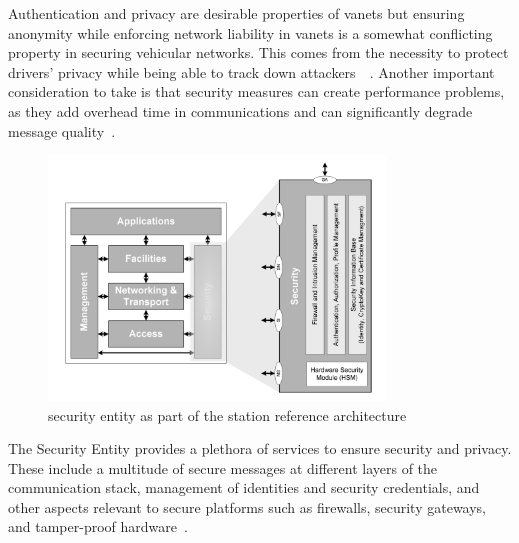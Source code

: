 Authentication and privacy are desirable properties of \glspl{vanet} but ensuring anonymity while enforcing network liability in \glspl{vanet} is a somewhat conflicting property in securing vehicular networks. This comes from the necessity to protect drivers' privacy while being able to track down attackers~\cite{jiang_ieee_2008}~\cite{malhi_security_2020}. 
Another important consideration to take is that security measures can create performance problems, as they add overhead time in communications and can significantly degrade message quality~\cite{toor_vehicle_2008}. 


\begin{figure}[htbp]
    \centering
    \includegraphics[width=0.8\textwidth]{Chapters/Figures/VANETs/security_entity.png}
   	\caption{ security entity as part of the  station reference architecture~\cite{etsi_intelligent_2010}}
   	\label{fig:security_entity}
\end{figure}


The Security Entity provides a plethora of services to ensure security and privacy. These include a multitude of secure messages at different layers of the communication stack, management of identities and security credentials, and other aspects relevant to secure platforms such as firewalls, security gateways, and tamper-proof hardware~\cite{etsi_intelligent_2014}.


